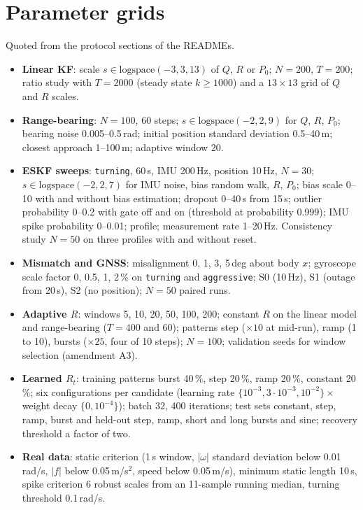\documentclass[11pt,a4paper]{article}
\begin{document}
\section{Parameter grids}\label{app:grids}
Quoted from the protocol sections of the READMEs.
\begin{itemize}
\item \textbf{Linear KF}: scale $s\in\mathrm{logspace}(-3,3,13)$ of $Q$, $R$ or $P_0$; $N=200$, $T=200$;
ratio study with $T=2000$ (steady state $k\ge1000$) and a $13\times13$ grid of $Q$ and $R$ scales.
\item \textbf{Range-bearing}: $N=100$, 60 steps; $s\in\mathrm{logspace}(-2,2,9)$ for $Q$, $R$, $P_0$;
bearing noise 0.005--0.5\,rad; initial position standard deviation 0.5--40\,m; closest approach
1--100\,m; adaptive window 20.
\item \textbf{ESKF sweeps}: \texttt{turning}, 60\,s, IMU 200\,Hz, position 10\,Hz, $N=30$;
$s\in\mathrm{logspace}(-2,2,7)$ for IMU noise, bias random walk, $R$, $P_0$; bias scale 0--10 with
and without bias estimation; dropout 0--40\,s from 15\,s; outlier probability 0--0.2 with gate off
and on (threshold at probability 0.999); IMU spike probability 0--0.01; profile; measurement rate
1--20\,Hz. Consistency study $N=50$ on three profiles with and without reset.
\item \textbf{Mismatch and GNSS}: misalignment 0, 1, 3, 5\,deg about body $x$; gyroscope scale factor
0, 0.5, 1, 2\,\% on \texttt{turning} and \texttt{aggressive}; S0 (10\,Hz), S1 (outage from 20\,s),
S2 (no position); $N=50$ paired runs.
\item \textbf{Adaptive $R$}: windows 5, 10, 20, 50, 100, 200; constant $R$ on the linear model and
range-bearing ($T=400$ and 60); patterns step ($\times10$ at mid-run), ramp (1 to 10), bursts
($\times25$, four of 10 steps); $N=100$; validation seeds for window selection (amendment A3).
\item \textbf{Learned $R_t$}: training patterns burst 40\,\%, step 20\,\%, ramp 20\,\%, constant 20\,\%;
six configurations per candidate (learning rate $\{10^{-3},3\cdot10^{-3},10^{-2}\}\times$ weight decay
$\{0,10^{-4}\}$); batch 32, 400 iterations; test sets constant, step, ramp, burst and held-out step,
ramp, short and long bursts and sine; recovery threshold a factor of two.
\item \textbf{Real data}: static criterion (1\,s window, $|\omega|$ standard deviation below
0.01\,rad/s, $|f|$ below 0.05\,m/s$^2$, speed below 0.05\,m/s), minimum static length 10\,s, spike
criterion 6 robust scales from an 11-sample running median, turning threshold 0.1\,rad/s.
\end{itemize}
\end{document}
